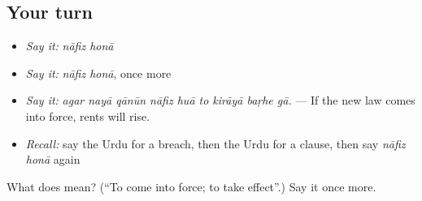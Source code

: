 \subsection*{Your turn}
\begin{itemize}
\raggedright
  \item \emph{Say it:} \emph{nāfiz honā}
  \item \emph{Say it:} \emph{nāfiz honā}, once more
  \item \emph{Say it:} \emph{agar nayā qānūn nāfiz huā to kirāyā baṛhe gā.} — If the new law comes into force, rents will rise.
  \item \emph{Recall:} say the Urdu for a breach, then the Urdu for a clause, then say \emph{nāfiz honā} again
\end{itemize}

\begin{tcolorbox}[breakable,colback=teal!4,colframe=teal!35!black,title={Before you move on}]
What does   mean? (\textquotedblleft{}To come into force; to take effect\textquotedblright{}.) Say it once more.
\end{tcolorbox}
